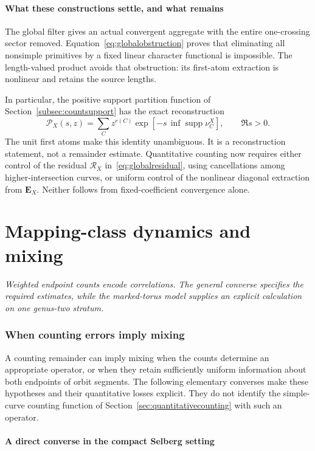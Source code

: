 \documentclass[11pt,a4paper]{article}
\newcommand{\monographpart}[2]{%
  \clearpage\part{#1}%
  \noindent\textit{#2}\par\medskip}
\numberwithin{equation}{section}
\theoremstyle{definition}
\theoremstyle{remark}
\begin{document}
\subsection{What these constructions settle, and what remains}

The global filter gives an actual convergent aggregate with the
entire one-crossing sector removed. Equation~\eqref{eq:globalobstruction}
proves that eliminating all nonsimple primitives by a fixed linear
character functional is impossible. The length-valued product
avoids that obstruction: its first-atom extraction is nonlinear
and retains the source lengths.

In particular, the positive support partition function of
Section~\ref{subsec:countsupport} has the exact reconstruction
\[
 \mathcal P_X(s,z)
 =\sum_C z^{r(C)}
   \exp\!\left[-s\,\inf\operatorname{supp}\nu_C^X\right],
 \qquad \Re s>0.
\]
The unit first atoms make this identity unambiguous. It is a
reconstruction statement, not a remainder estimate. Quantitative
counting now requires either control of the residual
$\mathcal R_X$ in~\eqref{eq:globalresidual}, using cancellations
among higher-intersection curves, or uniform control of the
nonlinear diagonal extraction from $\mathbf E_X$. Neither follows
from fixed-coefficient convergence alone.

\clearpage

\monographpart{Mapping-class dynamics and mixing}{Weighted endpoint counts encode correlations. The general converse specifies the required estimates, while the marked-torus model supplies an explicit calculation on one genus-two stratum.}

\section{When counting errors imply mixing}
\label{sec:countmixing}

A counting remainder can imply mixing when the counts determine an
appropriate operator, or when they retain sufficiently uniform information
about both endpoints of orbit segments. The following elementary
converses make these hypotheses and their quantitative losses explicit.
They do not identify the simple-curve counting function of
Section~\ref{sec:quantitativecounting} with such an operator.

\subsection{A direct converse in the compact Selberg setting}
\label{subsec:countmixselberg}
\end{document}
